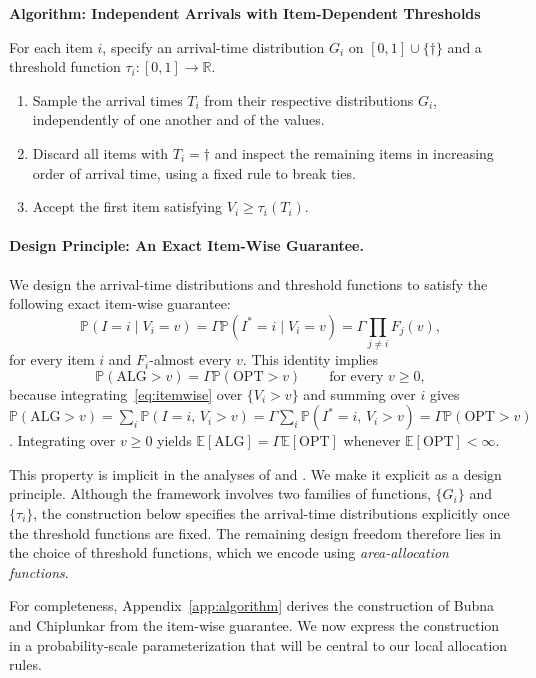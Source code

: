 \documentclass[11pt]{article}
\theoremstyle{definition}
\theoremstyle{remark}
\newcommand{\Pp}{\mathbb P}
\newcommand{\E}{\mathbb E}
\newcommand{\R}{\mathbb R}
\newcommand{\ALG}{\mathrm{ALG}}
\newcommand{\OPT}{\mathrm{OPT}}
\begin{document}
\begin{tcolorbox}
\label{alg:independent-arrivals}
\begin{center}
\small\textbf{Algorithm: Independent Arrivals with Item-Dependent Thresholds}
\end{center}
For each item $i$, specify an arrival-time distribution $G_i$ on $[0,1]\cup\{\dagger\}$ and a threshold function $\tau_i:[0,1]\to\R$.
\begin{enumerate}
\item Sample the arrival times $T_i$ from their respective distributions $G_i$, independently of one another and of the values.
\item Discard all items with $T_i=\dagger$ and inspect the remaining items in increasing order of arrival time, using a fixed rule to break ties.
\item Accept the first item satisfying $V_i\ge\tau_i(T_i)$.
\end{enumerate}
\end{tcolorbox}

\paragraph{Design Principle: An Exact Item-Wise Guarantee.}
We design the arrival-time distributions and threshold functions to satisfy the following exact item-wise guarantee:
\begin{equation}\label{eq:itemwise}
 \Pp(I=i\mid V_i=v)
 =\Gamma\Pp(I^*=i\mid V_i=v)
 =\Gamma\prod_{j\ne i}F_j(v),
\end{equation}
for every item $i$ and $F_i$-almost every $v$.
This identity implies
\[
 \Pp(\ALG>v)=\Gamma\Pp(\OPT>v)
 \qquad\text{for every $v\ge0$},
\]
because integrating~\eqref{eq:itemwise} over $\{V_i>v\}$ and summing over $i$ gives
$\Pp(\ALG>v)=\sum_i\Pp(I=i,\,V_i>v)=\Gamma\sum_i\Pp(I^*=i,\,V_i>v)=\Gamma\Pp(\OPT>v)$.
Integrating over $v\ge0$ yields $\E[\ALG]=\Gamma\E[\OPT]$ whenever $\E[\OPT]<\infty$.

This property is implicit in the analyses of \citet{PT} and \citet{BC}.
We make it explicit as a design principle.
Although the framework involves two families of functions, $\{G_i\}$ and $\{\tau_i\}$, the construction below specifies the arrival-time distributions explicitly once the threshold functions are fixed.
The remaining design freedom therefore lies in the choice of threshold functions, which we encode using \emph{area-allocation functions}.

For completeness, Appendix~\ref{app:algorithm} derives the construction of Bubna and Chiplunkar from the item-wise guarantee.
We now express the construction in a probability-scale parameterization that will be central to our local allocation rules.
\end{document}
